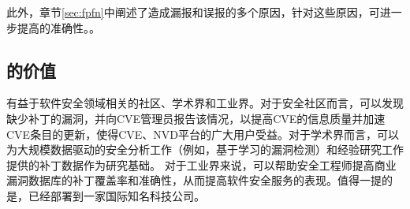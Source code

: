 此外，章节\ref{sec:fpfn}中阐述了造成\tool 漏报和误报的多个原因，针对这些原因，可进一步提高\tool 的准确性。。

\subsection{\tool 的价值}
\tool 有益于软件安全领域相关的社区、学术界和工业界。对于安全社区而言，\tool 可以发现缺少补丁的漏洞，并向CVE管理员报告该情况，以提高CVE的信息质量并加速CVE条目的更新，使得CVE、NVD平台的广大用户受益。对于学术界而言，\tool 可以为大规模数据驱动的安全分析工作（例如，基于学习的漏洞检测\cite{li2018vuldeepecker,zhou2019devign}）和经验研究工作提供的补丁数据作为研究基础。%
对于工业界来说，\tool 可以帮助安全工程师提高商业漏洞数据库的补丁覆盖率和准确性，从而提高软件安全服务的表现。值得一提的是，\tool 已经部署到一家国际知名科技公司。%